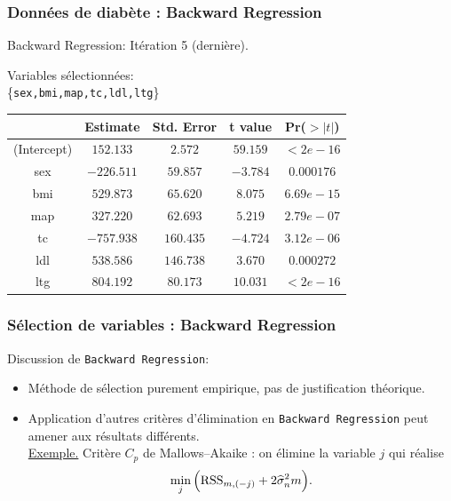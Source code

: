 \begin{frame}
\frametitle{Données de diabète : Backward Regression}

\centerline\alert{Backward Regression: Itération 5 (dernière).}


\begin{center}

Variables sélectionnées:\\\vspace{2mm}
\{\texttt{sex,bmi,map,\alert{tc,ldl},ltg}\}


\vspace{4mm}

{\small
\begin{tabular}{|c||c|c|c|c|}
\hline &Estimate&Std. Error&t value&Pr($>|t|$)\\\hline (Intercept)
&$152.133$&$2.572$&$59.159$&$< 2e-16$
\\\hline
sex &$-226.511$&$59.857$&$-3.784$&$0.000176$\\
bmi&$529.873$&$65.620$&$8.075$&$6.69e-15$\\\hline
map&$327.220$&$62.693$&$5.219$&$2.79e-07$\\
tc&$-757.938$&$160.435$&$-4.724$&$3.12e-06$\\\hline
ldl&$538.586$&$146.738$&$3.670$&$0.000272$\\
ltg&$804.192$&$80.173$&$10.031$&$< 2e-16$\\\hline
\end{tabular}
}
\end{center}
\end{frame}

\begin{frame}
\frametitle{Sélection de variables : Backward Regression}

Discussion de \texttt{Backward Regression}:

\begin{itemize}
\item Méthode de sélection purement empirique, pas de justification
théorique.
\item Application d'autres critères d'élimination en
\texttt{Backward Regression} peut amener aux résultats différents.\\
\underline{Exemple.} \alert{Critère $C_p$} de Mallows--Akaike
: on élimine la variable $j$ qui réalise
$$
\min_j \Big({\rm RSS}_{m, (-j)} + 2\widehat\sigma^2_n m\Big).
$$
\end{itemize}
\end{frame}

